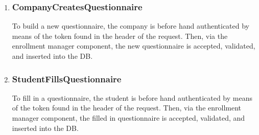\begin{enumerate}[label=\textbf{RV\arabic* -}]
\item \subsubsection{CompanyCreatesQuestionnaire}

To build a new questionnaire, the company is before hand authenticated by means of the token found in the header of the request.
Then, via the enrollment manager component, the new questionnaire is accepted, validated, and inserted into the DB.

\begin{figure}[H]
    \centering
\end{figure}

\item \subsubsection{StudentFillsQuestionnaire}

To fill in a questionnaire, the student is before hand authenticated by means of the token found in the header of the request.
Then, via the enrollment manager component, the filled in questionnaire is accepted, validated, and inserted into the DB.

\begin{figure}[H]
    \centering
\end{figure}


\end{enumerate}

